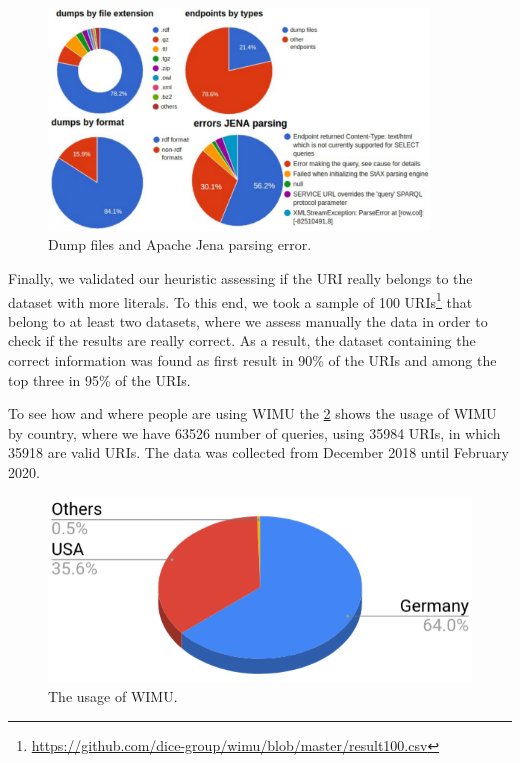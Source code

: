 \documentclass[sw]{iosart2x}
\begin{document}
\begin{figure}[htp] 
	\centering
	\includegraphics[width=0.9\textwidth]{img/dumps3.pdf}
	\caption{Dump files and Apache Jena parsing error.}
	\label{fig:dumps}
\end{figure}

Finally, we validated our heuristic assessing if the URI really belongs to the dataset with more literals.
To this end, we took a sample of 100 URIs\footnote{\url{https://github.com/dice-group/wimu/blob/master/result100.csv}} that belong to at least two datasets, where we assess manually the data in order to check if the results are really correct. 
As a result, the dataset containing the correct information was found as first result in 90\% of the URIs and among the top three in 95\% of the URIs.

To see how and where people are using WIMU the \cref{fig:wimuUsage} shows the usage of WIMU by country, where we have \num{63526} number of queries, using \num{35984} URIs, in which \num{35918} are valid URIs. The data was collected from December 2018 until February 2020. 

\begin{figure}[htp] 
	\centering
	\includegraphics[width=\linewidth]{img/wimuUsage.png}
	\caption{The usage of WIMU.}
	\label{fig:wimuUsage}
\end{figure}
\end{document}
